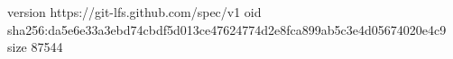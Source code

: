 version https://git-lfs.github.com/spec/v1
oid sha256:da5e6e33a3ebd74cbdf5d013ce47624774d2e8fca899ab5c3e4d05674020e4c9
size 87544
